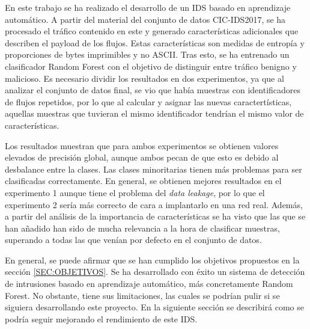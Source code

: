 En este trabajo se ha realizado el desarrollo de un IDS basado en aprendizaje automático. A partir del material del conjunto de datos CIC-IDS2017, se ha procesado el tráfico contenido en este y generado características adicionales que describen el payload de los flujos. Estas características son medidas de entropía y proporciones de bytes imprimibles y no ASCII. Tras esto, se ha entrenado un clasificador Random Forest con el objetivo de distinguir entre tráfico benigno y malicioso. Es necesario dividir los resultados en dos experimentos, ya que al analizar el conjunto de datos final, se vio que había muestras con identificadores de flujos repetidos, por lo que al calcular y asignar las nuevas caractertísticas, aquellas muestras que tuvieran el mismo identificador tendrían el mismo valor de características.

Los resultados muestran que para ambos experimentos se obtienen valores elevados de precisión global, aunque ambos pecan de que esto es debido al desbalance entre la clases. Las clases minoritarias tienen más problemas para ser clasificadas correctamente. En general, se obtienen mejores resultados en el experimento 1 aunque tiene el problema del \textit{data leakage}, por lo que el experimento 2 sería más correcto de cara a implantarlo en una red real. Además, a partir del análisis de la importancia de características se ha visto que las que se han añadido han sido de mucha relevancia a la hora de clasificar muestras, superando a todas las que venían por defecto en el conjunto de datos. 

En general, se puede afirmar que se han cumplido los objetivos propuestos en la sección \ref{SEC:OBJETIVOS}. Se ha desarrollado con éxito un sistema de detección de intrusiones basado en aprendizaje automático, más concretamente Random Forest. No obstante, tiene sus limitaciones, las cuales se podrían pulir si se siguiera desarrollando este proyecto. En la siguiente sección se describirá como se podría seguir mejorando el rendimiento de este IDS.